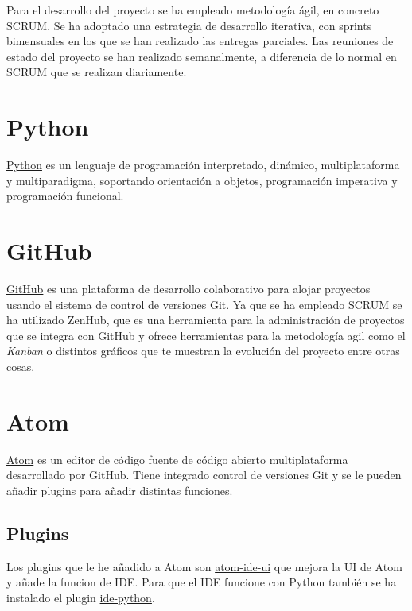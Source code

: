 Para el desarrollo del proyecto se ha empleado metodología ágil, en concreto SCRUM. Se ha adoptado una estrategia de desarrollo iterativa, con sprints bimensuales en los que se han realizado las entregas parciales. Las reuniones de estado del proyecto se han realizado semanalmente, a diferencia de lo normal en SCRUM que se realizan diariamente.

\section{Python}

\href{https://www.python.org/}{Python} es un lenguaje de programación interpretado, dinámico, multiplataforma y multiparadigma, soportando orientación a objetos, programación imperativa y programación funcional.

\section{GitHub}

\href{https://github.com/}{GitHub} \cite{noauthor_GitHub_nodate}es una plataforma de desarrollo colaborativo para alojar proyectos usando el sistema de control de versiones Git. Ya que se ha empleado SCRUM se ha utilizado ZenHub, que es una herramienta para la administración de proyectos que se integra con GitHub y ofrece herramientas para la metodología agil como el \textit{Kanban} o distintos gráficos que te muestran la evolución del proyecto entre otras cosas.

\section{Atom}

\href{https://atom.io/}{Atom} es un editor de código fuente de código abierto multiplataforma desarrollado por GitHub. Tiene integrado control de versiones Git y se le pueden añadir plugins para añadir distintas funciones.

\subsection{Plugins}

Los plugins que le he añadido a Atom son \href{https://atom.io/packages/atom-ide-ui}{atom-ide-ui} que mejora la UI de Atom y añade la funcion de IDE. Para que el IDE funcione con Python también se ha instalado el plugin \href{https://atom.io/packages/ide-python}{ide-python}.


